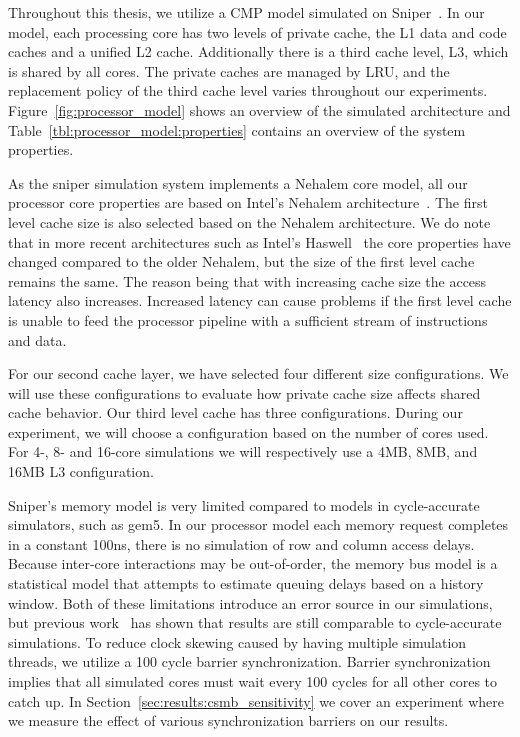 Throughout this thesis, we utilize a CMP model simulated on Sniper~\cite{Carlson2011a}. 
In our model, each processing core has two levels of private cache, the L1 data and code caches and a unified L2 cache.
Additionally there is a third cache level, L3, which is shared by all cores. 
The private caches are managed by LRU, and the replacement policy of the third cache level varies throughout our experiments.
Figure~\ref{fig:processor_model} shows an overview of the simulated architecture and Table~\ref{tbl:processor_model:properties} contains an overview of the system properties.

As the sniper simulation system implements a Nehalem core model, all our processor core properties are based on Intel's Nehalem architecture~\cite{Thomadakis2011}. 
The first level cache size is also selected based on the Nehalem architecture. 
We do note that in more recent architectures such as Intel's Haswell~\cite{Jain2013} the core properties have changed compared to the older Nehalem, but the size of the first level cache remains the same.
The reason being that with increasing cache size the access latency also increases. 
Increased latency can cause problems if the first level cache is unable to feed the processor pipeline with a sufficient stream of instructions and data.

For our second cache layer, we have selected four different size configurations.
We will use these configurations to evaluate how private cache size affects shared cache behavior.
Our third level cache has three configurations.
During our experiment, we will choose a configuration based on the number of cores used.
For 4-, 8- and 16-core simulations we will respectively use a 4MB, 8MB, and 16MB L3 configuration.

Sniper's memory model is very limited compared to models in cycle-accurate simulators, such as gem5.
In our processor model each memory request completes in a constant 100ns, there is no simulation of row and column access delays.
Because inter-core interactions may be out-of-order, the memory bus model is a statistical model that attempts to estimate queuing delays based on a history window.
Both of these limitations introduce an error source in our simulations, but previous work~\cite{Carlson2011a, Olsen2014} has shown that results are still comparable to cycle-accurate simulations.
To reduce clock skewing caused by having multiple simulation threads, we utilize a 100 cycle barrier synchronization.
Barrier synchronization implies that all simulated cores must wait every 100 cycles for all other cores to catch up.
In Section~\ref{sec:results:csmb_sensitivity} we cover an experiment where we measure the effect of various synchronization barriers on our results.

